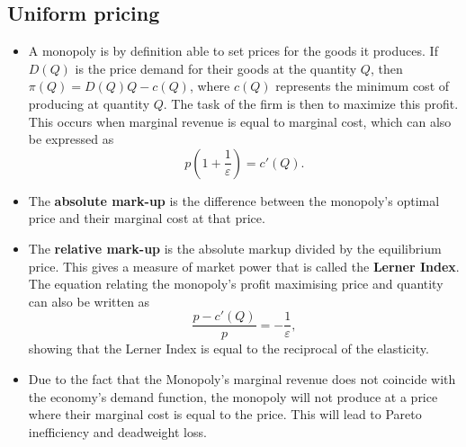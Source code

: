 \documentclass[a4paper]{article}
\begin{document}
\subsection{Uniform pricing}
\begin{itemize}
    \item A monopoly is by definition able to set prices for the goods it produces. If $D(Q)$ is the price demand for their goods at the quantity $Q$, then $\pi(Q) = D(Q)Q - c(Q)$, where $c(Q)$ represents the minimum cost of producing at quantity $Q$. The task of the firm is then to maximize this profit. This occurs when marginal revenue is equal to marginal cost, which can also be expressed as $$p(1+ \frac{1}{\varepsilon}) = c'(Q).$$
    \item The \textbf{absolute mark-up} is the difference between the monopoly's optimal price and their marginal cost at that price. 
    \item The \textbf{relative mark-up} is the absolute markup divided by the equilibrium price. This gives a measure of market power that is called the \textbf{Lerner Index}. The equation relating the monopoly's profit maximising price and quantity can also be written as $$\frac{p - c'(Q)}{p} = -\frac{1}{\varepsilon},$$ showing that the Lerner Index is equal to the reciprocal of the elasticity.
    \item Due to the fact that the Monopoly's marginal revenue does not coincide with the economy's demand function, the monopoly will not produce at a price where their marginal cost is equal to the price. This will lead to Pareto inefficiency and deadweight loss. 
\end{itemize}
\end{document}
